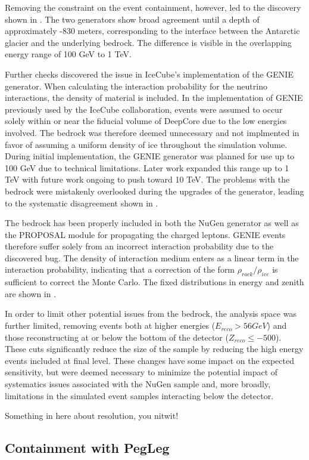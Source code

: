 Removing the constraint on the event containment, however, led to the discovery shown in .
The two generators show broad agreement until a depth of approximately -830 meters, corresponding to the interface between the Antarctic glacier and the underlying bedrock.
The difference is visible in the overlapping energy range of 100 GeV to 1 TeV.

Further checks discovered the issue in IceCube's implementation of the GENIE generator.
When calculating the interaction probability for the neutrino interactions, the density of material is included.
In the implementation of GENIE previously used by the IceCube collaboration, events were assumed to occur solely within or near the fiducial volume of DeepCore due to the low energies involved.
The bedrock was therefore deemed unnecessary and not implmented in favor of assuming a uniform density of ice throughout the simulation volume.
During initial implementation, the GENIE generator was planned for use up to 100 GeV due to technical limitations. 
Later work expanded this range up to 1 TeV with future work ongoing to push toward 10 TeV.
The problems with the bedrock were mistakenly overlooked during the upgrades of the generator, leading to the systematic disagreement shown in .

The bedrock has been properly included in both the NuGen generator as well as the PROPOSAL module for propagating the charged leptons.
GENIE events therefore suffer solely from an incorrect interaction probability due to the discovered bug.
The density of interaction medium enters as a linear term in the interaction probability, indicating that a correction of the form ${\rho_{rock}/\rho_{ice}}$ is sufficient to correct the Monte Carlo.
The fixed distributions in energy and zenith are shown in .

In order to limit other potential issues from the bedrock, the analysis space was further limited, removing events both at higher energies (${E_{reco}>56 GeV}$) and those reconstructing at or below the bottom of the detector (${Z_{reco}\leq-500}$).
These cuts significantly reduce the size of the sample by reducing the high energy events included at final level. 
These changes have some impact on the expected sensitivity, but were deemed necessary to minimize the potential impact of systematics issues associated with the NuGen sample and, more broadly, limitations in the simulated event samples interacting below the detector.


\label{sec:greco_properties}



Something in here about resolution, you nitwit!

\label{subsec:pegleg_containment}
\subsection{Containment with PegLeg}
